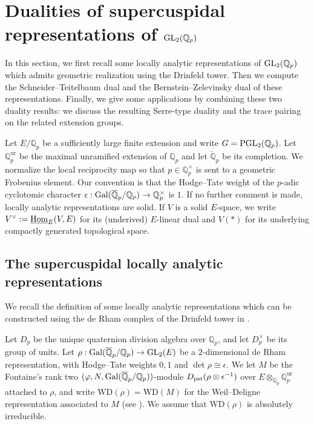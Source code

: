\documentclass[a4paper,10pt]{amsart}
\theoremstyle{remark}
\theoremstyle{definition}
\theoremstyle{plain}
\numberwithin{equation}{section}
\newcommand{\bbQ}{{\mathbb Q}}
\newcommand{\Gal}{{\rm Gal}}
\newcommand{\GL}{{\rm GL}}
\newcommand{\Hom}{{\rm Hom}}
\newcommand{\uHom}{\underline{\Hom}}
\newcommand{\PGL}{{\rm PGL}}
\newcommand{\WD}{\mathrm{WD}}
\begin{document}
\section{Dualities of supercuspidal representations of
\texorpdfstring{$\GL_2(\bbQ_p)$}{GL2(Qp)}}\label{sec:duality-supercuspidal}
In this section, we first recall some locally analytic representations of $\GL_2(\mathbb{Q}_p)$ which admits geometric realization using the Drinfeld tower. Then we compute the Schneider--Teitelbaum dual and the Bernstein--Zelevinsky dual of these representations. Finally, we give some applications by combining these two duality results: we discuss the resulting Serre-type duality and the trace pairing on the related extension groups.

Let $E/\bbQ_p$ be a sufficiently large finite extension and write $G=\PGL_2(\bbQ_p)$. Let $\bbQ_p^{\mathrm{ur}}$ be the maximal unramified extension of $\bbQ_p$ and let $\breve{\mathbb Q}_p$ be its completion. We normalize the local reciprocity map so that $p\in\bbQ_p^{\times}$ is sent to a geometric Frobenius element. Our convention is that the Hodge--Tate weight of the $p$-adic cyclotomic character $\epsilon:\Gal(\overline{\mathbb{Q}}_p/\bbQ_p)\to\bbQ_p^\times$ is $1$. If no further comment is made, locally analytic representations are solid. If $V$ is a solid $E$-space, we write $V^{\vee}:=\uHom_E(V,E)$ for its (underived) $E$-linear dual and $V(*)$ for its underlying compactly generated topological space.

\subsection{The supercuspidal locally analytic representations}\label{subsec:supercuspidal-representations}
We recall the definition of some locally analytic representations which can be constructed using the de Rham complex of the Drinfeld tower in \cite{dospinescuLeBras2017revetements}.  

Let $D_p$ be the unique 
quaternion division algebra over $\bbQ_p$, and let $D_p^\times$ be its group of units. Let $\rho:\Gal(\overline{\mathbb{Q}}_p/\bbQ_p)\to \GL_2(E)$ be a $2$-dimensional
de Rham representation, with Hodge--Tate weights $0,1$ and $\det\rho\cong\epsilon$. We let $M$ be the Fontaine's rank two $(\varphi,N,\Gal(\overline{\mathbb{Q}}_p/\bbQ_p))$-module $D_{\rm pst}(\rho\otimes \epsilon^{-1})$ over $E\otimes_{\bbQ_p}\bbQ_p^{\mathrm{ur}}$ attached to $\rho$, and write $\WD(\rho)=\WD(M)$ for the Weil--Deligne representation associated to $M$ (see \cite[\S~4]{breuilSchneider2007}). We assume that $\WD(\rho)$ is absolutely irreducible. 
\end{document}
